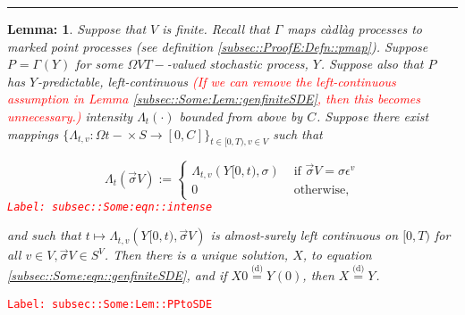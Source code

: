 \documentclass[12pt]{article}
\newcommand{\ra}{\rightarrow}
\newcommand{\te}{\text}
\newcommand{\ep}{\epsilon}
\newcommand{\tr}{\textcolor{red}}
\newcommand{\labe}[1]{\tr{\texttt{Label: #1}}}
\newcommand{\lin}{\rule{\linewidth}{0.4 pt}}
\newcommand{\deq}{\overset{\text{(d)}}{=}}			%
\renewcommand{\v}{v}							%
\renewcommand{\S}{S}							%
\newcommand{\s}{\sigma}							%
\newcommand{\sv}{\vec{\s}}						%
\newcommand{\ev}[1]{\ep^{#1}}					%
\newcommand{\T}{T}								%
\renewcommand{\t}{t}							%
\newcommand{\X}{X}								%
\newcommand{\V}{V}									%
\newcommand{\XState}[1]{\S^{#1}}				%
\newcommand{\rxvtt}[2]{Y_{#1}{(#2)}}				%
\newcommand{\rxvtts}[2]{Y_{#1}{#2}}					%
\newcommand{\rp}[1]{P^{#1}}							%
\newcommand{\ratee}[1]{\Lambda_{#1}}				%
\newcommand{\const}[1]{C_{#1}}						%
\newcommand{\pmap}[1]{\Gamma_{#1}}				%
\newtheorem{lem}[thms]{Lemma: }
\begin{document}
\lin

\begin{lem}
Suppose that \(\V\) is finite. Recall that \(\pmap{}\) maps c\`adl\`ag processes to marked point processes (see definition \ref{subsec::ProofE:Defn::pmap}). Suppose \(\rp{} = \pmap{}(\rxvtts{}{})\) for some \(\Omega{\V}{\T-}\)-valued stochastic process, \(\rxvtts{}{}\). Suppose also that \(\rp{}\) has \(\rxvtts{}{}\)-predictable, left-continuous \tr{(If we can remove the left-continuous assumption in Lemma \ref{subsec::Some:Lem::genfiniteSDE}, then this becomes unnecessary.)} intensity \(\ratee{\t}(\cdot)\) bounded from above by \(\const{}\). Suppose there exist mappings \(\{\ratee{\t,\v}:\Omega{}{\t-}\times \S \ra [0,\const{}]\}_{\t\in[0,\T),\v\in \V}\) such that 

\begin{equation}
\ratee{\t}(\sv{}{\V}) := \begin{cases}
\ratee{\t,\v}(\rxvtts{}{[0,\t)},\s) &\te{ if } \sv{}{\V} = \s\ev{\v}\\
0 &\te{ otherwise,}
\end{cases}
\label{subsec::Some:eqn::intense}
\end{equation}
\labe{subsec::Some:eqn::intense}

and such that \(\t\mapsto \ratee{\t,\v}(\rxvtts{}{[0,\t)},\sv{}{\V})\) is almost-surely left continuous on \([0,\T)\) for all \(\v\in \V,\sv{}{\V}\in \S^\V\). Then there is a unique solution, \(\X{}{}\), to equation \eqref{subsec::Some:eqn::genfiniteSDE}, and if \(\X{}{0} \deq \rxvtt{}{0}\), then \(\X{}{} \deq \rxvtts{}{}\).

\label{subsec::Some:Lem::PPtoSDE}
\end{lem}
\labe{subsec::Some:Lem::PPtoSDE}
\end{document}
